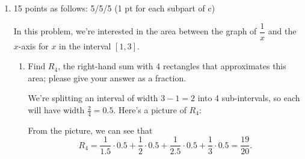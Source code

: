\documentclass{article}
\begin{document}
\begin{enumerate}
\begin{enumerate}
    \begin{solution} 
      $L_{50}$ is 0.98421 and $R_{50}$ is 1.01563, which suggests the
      exact area might be 1.
    \end{solution}

  \end{enumerate}


  \pspace{\newpage}


\item 

\begin{grading}
15 points as follows: 5/5/5 (1 pt for each subpart of c)
\end{grading}


  In this problem, we're interested in the area between the graph of
  $\dfrac{1}{x}$ and the $x$-axis for $x$ in the interval $[1, 3]$.
  \begin{enumerate}
  \item
\begin{problem}[\vfill]
      Find $R_4$, the right-hand sum with 4 rectangles that approximates
      this area; please give your answer as a fraction.  
    \end{problem}

    \begin{solution} %
      We're splitting an interval of width $3 - 1 = 2$ into 4
      sub-intervals, so each will have width $\frac{2}{4} = 0.5$.  Here's
      a picture of $R_4$:
      \begin{center}
      \end{center}
      From the picture, we can see that
      \[ R_4 = \frac{1}{1.5} \cdot 0.5 + \frac{1}{2} \cdot 0.5 +
      \frac{1}{2.5} \cdot 0.5 + \frac{1}{3} \cdot 0.5 =
      \boxed{\frac{19}{20}}.\]
    \end{solution}


\end{enumerate}
\end{enumerate}
\end{document}
